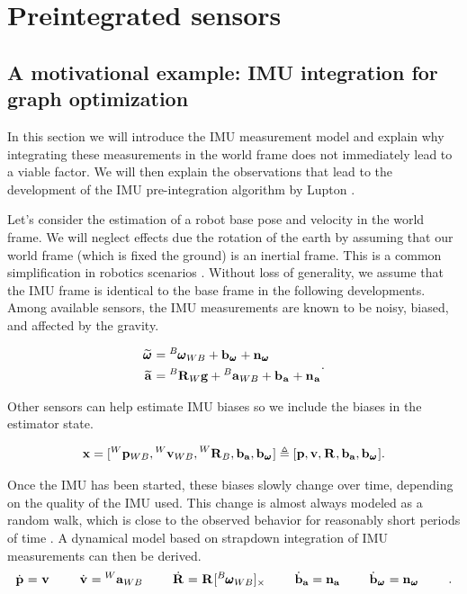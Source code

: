 \chapter{Preintegrated sensors}
\label{chp:preintegration}
\minitoc

\label{chp:preintegrated}

  
\section{A motivational example: IMU integration for graph optimization}
In this section we will introduce the IMU measurement model and explain why integrating these measurements in the world frame does not immediately
lead to a viable factor. We will then explain the observations that lead to the development of the IMU pre-integration algorithm by Lupton \cite{lupton-09}.

Let's consider the estimation of a robot base pose and velocity in the world frame. We will neglect effects due the rotation of the earth by assuming 
that our world frame (which is fixed \wrt the ground) is an inertial frame. This is a common simplification in robotics scenarios \cite{forster2017-TRO}. 
Without loss of generality, we assume that the IMU frame is identical to the base frame 
in the following developments. Among available sensors, the IMU measurements are known to be noisy, biased, and affected by the gravity.

\begin{equation}
    \begin{split}
    \prescript{}{}{\widetilde{\pmb{\omega}}}_{} &= \prescript{B}{}{\pmb{\omega}}_{WB} + {\bf b}_{\prescript{}{}{\pmb{\omega}}_{}} + {\bf n}_{\prescript{}{}{\pmb{\omega}}_{}} 
    \\
    \prescript{}{}{\widetilde{{\bf a}}}_{}    &= \prescript{B}{}{{\bf R}}_{W} {\bf g} + \prescript{B}{}{{\bf a}}_{WB} + {\bf b}_{\prescript{}{}{{\bf a}}_{}} + {\bf n}_{\prescript{}{}{{\bf a}}_{}} 
    \end{split}.
    \label{eq:imu_meas_model}
\end{equation}
    
Other sensors can help estimate IMU biases so we include the biases in the estimator state.

\begin{equation}
    {\bf x} = [\prescript{W}{}{{\bf p}}_{WB}, \prescript{W}{}{{\bf v}}_{WB}, \prescript{W}{}{{\bf R}}_{B}, {\bf b}_{{\bf a}}, {\bf b}_{\prescript{}{}{\pmb{\omega}}_{}}]
    \triangleq 
    [{\bf p}, {\bf v}, \prescript{}{}{{\bf R}}_{}, {\bf b}_{{\bf a}}, {\bf b}_{\prescript{}{}{\pmb{\omega}}_{}}] .
\end{equation}

Once the IMU has been started, these biases slowly change over time, depending on the quality of the IMU used. This change is almost always modeled 
as a random walk, which is close to the observed behavior for reasonably short periods of time \cite{hussen2015low}.
A dynamical model based on strapdown integration of IMU measurements can then be derived.
%
\begin{equation}
    \begin{split}
    \dot{\prescript{}{}{{\bf p}}_{}} = \prescript{}{}{{\bf v}}_{}  ~~~~~~~
    \dot{\prescript{}{}{{\bf v}}_{}} = \prescript{W}{}{{\bf a}}_{WB} ~~~~~~~
    \dot{\prescript{}{}{{\bf R}}_{}} = \prescript{}{}{{\bf R}}_{} [\prescript{B}{}{\pmb{\omega}}_{WB}]_{\times} ~~~~~~~
    \dot{{\bf b}}_{{\bf a}} = {\bf n}_{{\bf a}}  ~~~~~~~
    \dot{{\bf b}}_{\prescript{}{}{\pmb{\omega}}_{}} = {\bf n}_{\prescript{}{}{\pmb{\omega}}_{}} ~~~~~~~
    \end{split}.
    \label{eq:imu_dyn_conti}
\end{equation}

